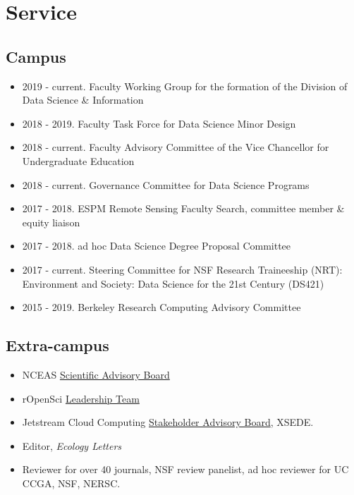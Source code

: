 \documentclass[10pt,sans]{moderncv}        %
\providecommand{\tightlist}{%
    \setlength{\itemsep}{0pt}\setlength{\parskip}{0pt}}
\begin{document}
\hypertarget{service}{%
\section{Service}\label{service}}

\hypertarget{campus}{%
\subsection{Campus}\label{campus}}

\begin{itemize}
\tightlist
\item
  2019 - current. Faculty Working Group for the formation of the
  Division of Data Science \& Information
\item
  2018 - 2019. Faculty Task Force for Data Science Minor Design
\item
  2018 - current. Faculty Advisory Committee of the Vice Chancellor for
  Undergraduate Education
\item
  2018 - current. Governance Committee for Data Science Programs
\item
  2017 - 2018. ESPM Remote Sensing Faculty Search, committee member \&
  equity liaison
\item
  2017 - 2018. ad hoc Data Science Degree Proposal Committee
\item
  2017 - current. Steering Committee for NSF Research Traineeship (NRT):
  Environment and Society: Data Science for the 21st Century (DS421)
\item
  2015 - 2019. Berkeley Research Computing Advisory Committee
\end{itemize}

\hypertarget{extra-campus}{%
\subsection{Extra-campus}\label{extra-campus}}

\begin{itemize}
\tightlist
\item
  NCEAS
  \href{https://www.nceas.ucsb.edu/content/nceas-science-advisers}{Scientific
  Advisory Board}
\item
  rOpenSci \href{https://ropensci.org/about/\#team}{Leadership Team}
\item
  Jetstream Cloud Computing
  \href{https://jetstream-cloud.org/about/advisory-board.php}{Stakeholder
  Advisory Board}, XSEDE.
\item
  Editor, \emph{Ecology Letters}
\item
  Reviewer for over 40 journals, NSF review panelist, ad hoc reviewer
  for UC CCGA, NSF, NERSC.
\end{itemize}
\end{document}
